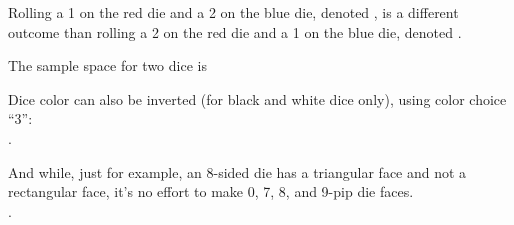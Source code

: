 \documentclass[12pt]{article}
\begin{document}
Rolling a 1 on the red die and a 2 on the blue die, denoted , is a different outcome than rolling a 2 on the red die and a 1 on the blue die, denoted . \\\bigskip

\noindent The sample space for two dice is \\\smallskip


\bigskip

\noindent Dice color can also be inverted (for black and white dice only), using color choice ``3'':\\

.

\bigskip

And while, just for example, an 8-sided die has a triangular face and not a rectangular face, it's no effort to make 0, 7, 8, and 9-pip die faces.\\

.
\end{document}

